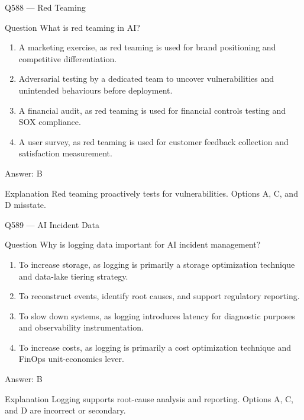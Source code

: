 \documentclass[aspectratio=169,8pt]{beamer}
\begin{document}
	\begin{frame}{Q588 --- Red Teaming}
		\begin{block}{Question}
			What is red teaming in AI?
			\begin{enumerate}
				\item A marketing exercise, as red teaming is used for brand positioning and competitive differentiation.
				\item Adversarial testing by a dedicated team to uncover vulnerabilities and unintended behaviours before deployment.
				\item A financial audit, as red teaming is used for financial controls testing and SOX compliance.
				\item A user survey, as red teaming is used for customer feedback collection and satisfaction measurement.
			\end{enumerate}
		\end{block}
		\begin{exampleblock}{Answer: B}\end{exampleblock}
		\begin{block}{Explanation}
			Red teaming proactively tests for vulnerabilities. Options A, C, and D misstate.
		\end{block}
	\end{frame}
	
	\begin{frame}{Q589 --- AI Incident Data}
		\begin{block}{Question}
			Why is logging data important for AI incident management?
			\begin{enumerate}
				\item To increase storage, as logging is primarily a storage optimization technique and data-lake tiering strategy.
				\item To reconstruct events, identify root causes, and support regulatory reporting.
				\item To slow down systems, as logging introduces latency for diagnostic purposes and observability instrumentation.
				\item To increase costs, as logging is primarily a cost optimization technique and FinOps unit-economics lever.
			\end{enumerate}
		\end{block}
		\begin{exampleblock}{Answer: B}\end{exampleblock}
		\begin{block}{Explanation}
			Logging supports root-cause analysis and reporting. Options A, C, and D are incorrect or secondary.
		\end{block}
	\end{frame}
	
\end{document}
